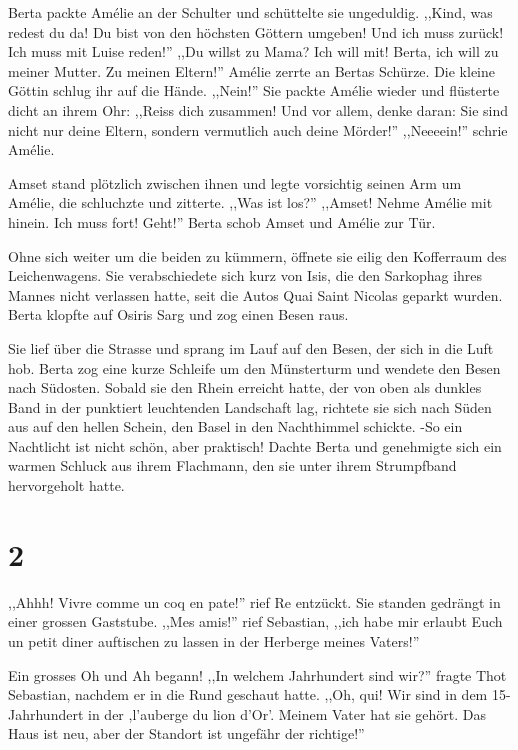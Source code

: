 Berta packte Amélie an der Schulter und schüttelte sie ungeduldig. ,,Kind, was redest du da! Du bist von den höchsten Göttern umgeben! Und ich muss zurück! Ich muss mit Luise reden!'' ,,Du willst zu Mama? Ich will mit! Berta, ich will zu meiner Mutter. Zu meinen Eltern!'' Amélie zerrte an Bertas Schürze. Die kleine Göttin schlug ihr auf die Hände. ,,Nein!'' Sie packte Amélie wieder und flüsterte dicht an ihrem Ohr: ,,Reiss dich zusammen! Und vor allem, denke daran: Sie sind nicht nur deine Eltern, sondern vermutlich auch deine Mörder!'' ,,Neeeein!'' schrie Amélie. 

Amset stand plötzlich zwischen ihnen und legte vorsichtig seinen Arm um Amélie, die schluchzte und zitterte. ,,Was ist los?'' ,,Amset! Nehme Amélie mit hinein. Ich muss fort! Geht!'' Berta schob Amset und Amélie zur Tür. 

Ohne sich weiter um die beiden zu kümmern, öffnete sie eilig den Kofferraum des Leichenwagens. Sie verabschiedete sich kurz von Isis, die den Sarkophag ihres Mannes nicht verlassen hatte, seit die Autos Quai Saint Nicolas geparkt wurden. Berta klopfte auf Osiris Sarg und zog einen Besen raus.

Sie lief über die Strasse und sprang im Lauf auf den Besen, der sich in die Luft hob. Berta zog eine kurze Schleife um den Münsterturm und wendete den Besen nach Südosten. Sobald sie den Rhein erreicht hatte, der von oben als dunkles Band in der punktiert leuchtenden Landschaft lag, richtete sie sich nach Süden aus auf den hellen Schein, den Basel in den Nachthimmel schickte. -So ein Nachtlicht ist nicht schön, aber praktisch! Dachte Berta und genehmigte sich ein warmen Schluck aus ihrem Flachmann, den sie unter ihrem Strumpfband hervorgeholt hatte.


\section*{2}

,,Ahhh! Vivre comme un coq en pate!'' rief Re entzückt. Sie standen gedrängt in einer grossen Gaststube. ,,Mes amis!'' rief Sebastian, ,,ich habe mir erlaubt Euch un petit diner auftischen zu lassen in der Herberge meines Vaters!''

Ein grosses Oh und Ah begann! ,,In welchem Jahrhundert sind wir?'' fragte Thot Sebastian, nachdem er in die Rund geschaut hatte. ,,Oh, qui! Wir sind in dem 15-Jahrhundert in der ,l'auberge du lion d'Or'. Meinem Vater hat sie gehört. Das Haus ist neu, aber der Standort ist ungefähr der richtige!'' 

